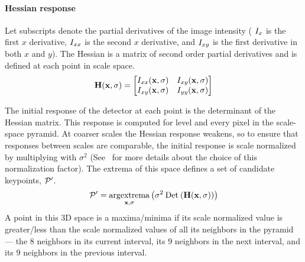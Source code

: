        \paragraph{Hessian response}
            Let subscripts denote the partial derivatives of the image
              intensity (\eg{} $I_{x}$ is the first $x$ derivative,
              $I_{xx}$ is the second $x$ derivative, and $I_{xy}$
              is the first derivative in both $x$ and $y$).
            The Hessian is a matrix of second order partial derivatives
              and is defined at each point in scale space.
            \begin{equation}
                \mathbf{H}(\mathbf{x}, \sigma) = 
                 \left[ \begin{matrix} 
                I_{xx}(\mathbf{x}, \sigma) & I_{xy}(\mathbf{x}, \sigma) \\
                I_{xy}(\mathbf{x}, \sigma) & I_{yy}(\mathbf{x}, \sigma)  \end{matrix} \right]  
            \end{equation}\label{eqn:hessianmatrix}  


            The initial response of the detector at each point is the
              determinant of the Hessian matrix.
            This response is computed for level and every pixel in the
              scale-space pyramid.
            At coarser scales the Hessian response weakens, so to
              ensure that responses between scales are comparable, the
              initial response is scale normalized by multiplying with
              $\sigma^2$ (See~\cite{lindeberg_feature_1998} for more
              details about the choice of this normalization factor).
            The extrema of this space defines a set of candidate
              keypoints, $\mathcal{P}'$.
            \begin{equation}
                \mathcal{P}' = \underset{\mathbf{x},\sigma}{\operatorname{argextrema}} \left(\sigma^2 \mathbin{\textrm{Det}}\left(\mathbf{H}(\mathbf{x}, \sigma)\right)\right) 
            \end{equation}
            A point in this 3D space is a maxima/minima if its scale
              normalized value is greater/less than the scale normalized values
              of all its neighbors in the pyramid --- \ie{} the $8$ neighbors in
              its current interval, its $9$ neighbors in the next interval, and
              its $9$ neighbors in the previous interval.


